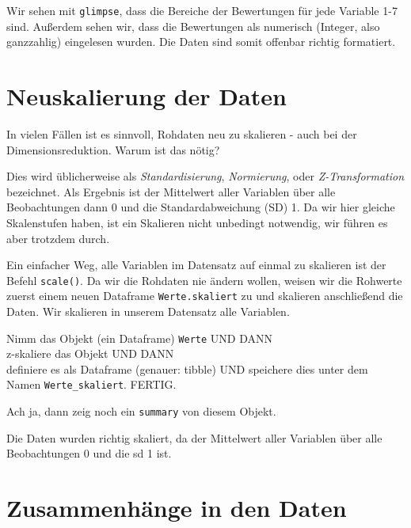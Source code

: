 \documentclass[12pt,ngerman,]{book}
\makeatletter
\newenvironment{Shaded}{\begin{snugshade}}{\end{snugshade}}
\newcommand{\KeywordTok}[1]{\textcolor[rgb]{0.13,0.29,0.53}{\textbf{#1}}}
\newcommand{\StringTok}[1]{\textcolor[rgb]{0.31,0.60,0.02}{#1}}
\newcommand{\OperatorTok}[1]{\textcolor[rgb]{0.81,0.36,0.00}{\textbf{#1}}}
\newcommand{\NormalTok}[1]{#1}
\newenvironment{kframe}{%
\medskip{}
\setlength{\fboxsep}{.8em}
 \def\at@end@of@kframe{}%
 \ifinner\ifhmode%
  \def\at@end@of@kframe{\end{minipage}}%
  \begin{minipage}{\columnwidth}%
 \fi\fi%
 \def\FrameCommand##1{\hskip\@totalleftmargin \hskip-\fboxsep
 \colorbox{shadecolor}{##1}\hskip-\fboxsep
     \hskip-\linewidth \hskip-\@totalleftmargin \hskip\columnwidth}%
 \MakeFramed {\advance\hsize-\width
   \@totalleftmargin\z@ \linewidth\hsize
   \@setminipage}}%
 {\par\unskip\endMakeFramed%
 \at@end@of@kframe}
\renewenvironment{Shaded}{\begin{kframe}}{\end{kframe}}
\theoremstyle{definition}
\theoremstyle{definition}
\theoremstyle{remark}
\let\BeginKnitrBlock\begin \let\EndKnitrBlock\end
\makeatother
\begin{document}
Wir sehen mit \texttt{glimpse}, dass die Bereiche der Bewertungen für
jede Variable 1-7 sind. Außerdem sehen wir, dass die Bewertungen als
numerisch (Integer, also ganzzahlig) eingelesen wurden. Die Daten sind
somit offenbar richtig formatiert.

\section{Neuskalierung der Daten}\label{neuskalierung-der-daten}

In vielen Fällen ist es sinnvoll, Rohdaten neu zu skalieren - auch bei
der Dimensionsreduktion. Warum ist das nötig?

Dies wird üblicherweise als \emph{Standardisierung}, \emph{Normierung},
oder \emph{Z-Transformation} bezeichnet. Als Ergebnis ist der Mittelwert
aller Variablen über alle Beobachtungen dann 0 und die
Standardabweichung (SD) 1. Da wir hier gleiche Skalenstufen haben, ist
ein Skalieren nicht unbedingt notwendig, wir führen es aber trotzdem
durch.

Ein einfacher Weg, alle Variablen im Datensatz auf einmal zu skalieren
ist der Befehl \texttt{scale()}. Da wir die Rohdaten nie ändern wollen,
weisen wir die Rohwerte zuerst einem neuen Dataframe
\texttt{Werte.skaliert} zu und skalieren anschließend die Daten. Wir
skalieren in unserem Datensatz alle Variablen.

\begin{Shaded}
\end{Shaded}

\BeginKnitrBlock{rmdpseudocode}
Nimm das Objekt (ein Dataframe) \texttt{Werte} UND DANN\\
z-skaliere das Objekt UND DANN\\
definiere es als Dataframe (genauer: tibble) UND speichere dies unter
dem Namen \texttt{Werte\_skaliert}. FERTIG.

Ach ja, dann zeig noch ein \texttt{summary} von diesem Objekt.
\EndKnitrBlock{rmdpseudocode}

Die Daten wurden richtig skaliert, da der Mittelwert aller Variablen
über alle Beobachtungen 0 und die sd 1 ist.

\section{Zusammenhänge in den Daten}\label{zusammenhange-in-den-daten}
\end{document}
